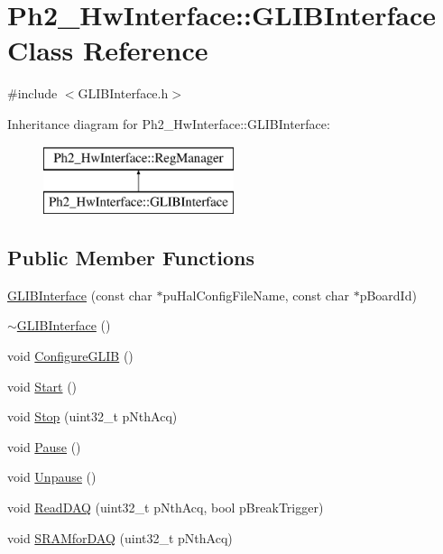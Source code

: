 \hypertarget{class_ph2___hw_interface_1_1_g_l_i_b_interface}{\section{Ph2\-\_\-\-Hw\-Interface\-:\-:G\-L\-I\-B\-Interface Class Reference}
\label{class_ph2___hw_interface_1_1_g_l_i_b_interface}
}


{\ttfamily \#include $<$G\-L\-I\-B\-Interface.\-h$>$}

Inheritance diagram for Ph2\-\_\-\-Hw\-Interface\-:\-:G\-L\-I\-B\-Interface\-:\begin{figure}[H]
\begin{center}
\leavevmode
\includegraphics[height=2.000000cm]{class_ph2___hw_interface_1_1_g_l_i_b_interface}
\end{center}
\end{figure}
\subsection*{Public Member Functions}
\begin{DoxyCompactItemize}
\item 
\hyperlink{class_ph2___hw_interface_1_1_g_l_i_b_interface_a6c11567e50b46ee41894ef4b55aa6ef9}{G\-L\-I\-B\-Interface} (const char $\ast$pu\-Hal\-Config\-File\-Name, const char $\ast$p\-Board\-Id)
\item 
\hyperlink{class_ph2___hw_interface_1_1_g_l_i_b_interface_a855b935c00c0c1a267be069bf060dedc}{$\sim$\-G\-L\-I\-B\-Interface} ()
\item 
void \hyperlink{class_ph2___hw_interface_1_1_g_l_i_b_interface_a184c9b6bff4282e42218f66115627c91}{Configure\-G\-L\-I\-B} ()
\item 
void \hyperlink{class_ph2___hw_interface_1_1_g_l_i_b_interface_a302bb9d57200f2da4889d5eb503777b8}{Start} ()
\item 
void \hyperlink{class_ph2___hw_interface_1_1_g_l_i_b_interface_a9e17e9e892909e4e21f0066264ff852f}{Stop} (uint32\-\_\-t p\-Nth\-Acq)
\item 
void \hyperlink{class_ph2___hw_interface_1_1_g_l_i_b_interface_a10d686f98e2978d93647aaf250404508}{Pause} ()
\item 
void \hyperlink{class_ph2___hw_interface_1_1_g_l_i_b_interface_a6a9df619d8d0c3961f9ae635cc5389c8}{Unpause} ()
\item 
void \hyperlink{class_ph2___hw_interface_1_1_g_l_i_b_interface_afdd87a6f34631f8d9cfba4409b6be979}{Read\-D\-A\-Q} (uint32\-\_\-t p\-Nth\-Acq, bool p\-Break\-Trigger)
\item 
void \hyperlink{class_ph2___hw_interface_1_1_g_l_i_b_interface_a8d97c10041d2376b17aa460b09ba02f6}{S\-R\-A\-Mfor\-D\-A\-Q} (uint32\-\_\-t p\-Nth\-Acq)
\end{DoxyCompactItemize}

